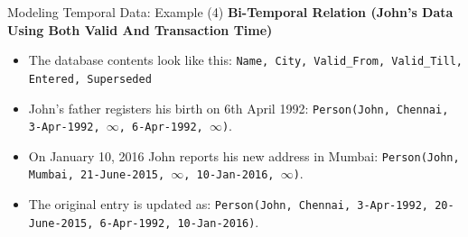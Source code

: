 \documentclass[aspectratio=169, xcolor=dvipsnames]{beamer}
\begin{document}
\begin{frame}{Modeling Temporal Data: Example (4)}
    \textbf{Bi-Temporal Relation (John's Data Using Both Valid And Transaction Time)}
    \begin{table}
    \centering
    \end{table}
    \begin{itemize}
        \item The database contents look like this: \texttt{Name, City, Valid\_From, Valid\_Till, Entered, Superseded}
        \item John's father registers his birth on 6th April 1992: \texttt{Person(John, Chennai, 3-Apr-1992, $\infty$, 6-Apr-1992, $\infty$)}.
        \item On January 10, 2016 John reports his new address in Mumbai: \texttt{Person(John, Mumbai, 21-June-2015, $\infty$, 10-Jan-2016, $\infty$)}.
        \item The original entry is updated as: \texttt{Person(John, Chennai, 3-Apr-1992, 20-June-2015, 6-Apr-1992, 10-Jan-2016)}.
    \end{itemize}
\end{frame}
\end{document}
